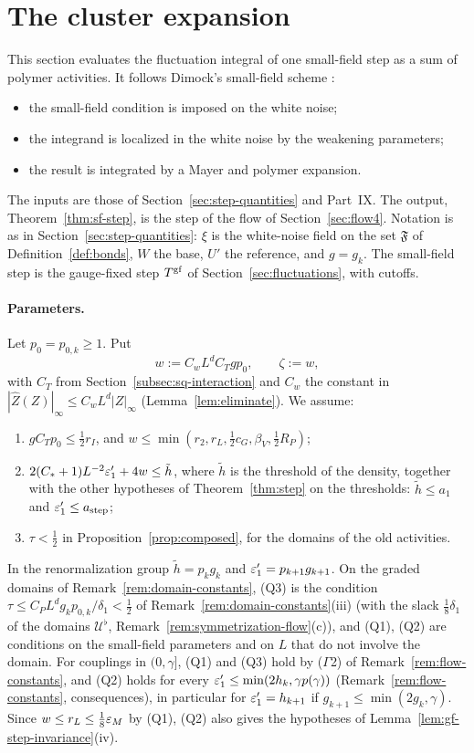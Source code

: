 \section{The cluster expansion}\label{sec:cluster}

This section evaluates the fluctuation integral of one small-field step as a sum of polymer activities. It follows Dimock's small-field scheme \cite[Sects.~4.3--4.6, App.~B]{DimockI}:
\begin{itemize}
\item the small-field condition is imposed on the white noise;
\item the integrand is localized in the white noise by the weakening parameters;
\item the result is integrated by a Mayer and polymer expansion.
\end{itemize}
The inputs are those of Section~\ref{sec:step-quantities} and Part~IX. The output, Theorem~\ref{thm:sf-step}, is the step of the flow of Section~\ref{sec:flow4}. Notation is as in Section~\ref{sec:step-quantities}: $\xi$ is the white-noise field on the set $\mathfrak F$ of Definition~\ref{def:bonds}, $W$ the base, $U'$ the reference, and $g=g_k$. The small-field step is the gauge-fixed step $T^{\rm gf}$ of Section~\ref{sec:fluctuations}, with cutoffs.

\paragraph{Parameters.} Let $p_0=p_{0,k}\ge1$. Put
\[
w:=C_wL^dC_Tgp_0,\qquad\zeta:=w,
\]
with $C_T$ from Section~\ref{subsec:sq-interaction} and $C_w$ the constant in $|\hat Z(Z)|_\infty\le C_wL^d|Z|_\infty$ (Lemma~\ref{lem:eliminate}). We assume:
\begin{enumerate}[label=(Q\arabic*)]
\item $gC_Tp_0\le\frac12r_I$, and $w\le\min(r_2,r_L,\frac12c_G,\beta_V,\frac12R_P)$;
\item $2(C_*+1)L^{-2}\varepsilon'_1+4w\le\tilde h$, where $\tilde h$ is the threshold of the density, together with the other hypotheses of Theorem~\ref{thm:step} on the thresholds: $\tilde h\le a_1$ and $\varepsilon'_1\le a_{\rm step}$;
\item $\tau<\frac12$ in Proposition~\ref{prop:composed}, for the domains of the old activities.
\end{enumerate}
In the renormalization group $\tilde h=p_kg_k$ and $\varepsilon'_1=p_{k+1}g_{k+1}$. On the graded domains of Remark~\ref{rem:domain-constants}, (Q3) is the condition $\tau\le C_PL^dg_kp_{0,k}/\delta_1<\frac12$ of Remark~\ref{rem:domain-constants}(iii) (with the slack $\frac18\delta_1$ of the domains $\mathcal U^\flat$, Remark~\ref{rem:symmetrization-flow}(c)), and (Q1), (Q2) are conditions on the small-field parameters and on $L$ that do not involve the domain. For couplings in $(0,\gamma]$, (Q1) and (Q3) hold by ($\Gamma$2) of Remark~\ref{rem:flow-constants}, and (Q2) holds for every $\varepsilon'_1\le\min(2h_k,\gamma p(\gamma))$ (Remark~\ref{rem:flow-constants}, consequences), in particular for $\varepsilon'_1=h_{k+1}$ if $g_{k+1}\le\min(2g_k,\gamma)$. Since $w\le r_L\le\frac18\varepsilon_M$ by (Q1), (Q2) also gives the hypotheses of Lemma~\ref{lem:gf-step-invariance}(iv).

